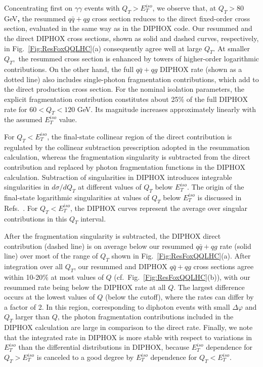 \documentclass[12pt,english,aps,preprint,prd,letterpaper,fleqn,nofootinbib,showpacs,showkeys,tightenlines,floatfix]{revtex4}
\begin{document}
{Concentrating first on $\gamma\gamma$ events with $Q_{T}>E_{T}^{iso}$,
we observe that, at $Q_{T}>80$ GeV\textbf{,} the resummed $q\bar{q}+qg$
cross section reduces to the direct fixed-order cross section, evaluated
in the same way as in the DIPHOX code. Our resummed and the direct
DIPHOX cross sections, shown as solid and dashed curves, respectively,
in Fig.~\ref{Fig:ResFoxQQLHC}(a) consequently agree well at large
$Q_{T}$. At smaller $Q_{T},$ the resummed cross section is enhanced
by towers of higher-order logarithmic contributions. On the other
hand, the full $q\bar{q}+qg$ DIPHOX rate (shown as a dotted line) also
includes single-photon fragmentation contributions, which add to
the direct production cross section.  For the nominal isolation parameters,
the explicit fragmentation contribution constitutes about 25\% of
the full DIPHOX rate for $60<Q_{T}<120$ GeV. Its magnitude increases
approximately linearly with the assumed $E_{T}^{iso}$ value.

For $Q_{T}<E_{T}^{iso}$, the final-state collinear region of the
direct contribution is regulated by the collinear subtraction prescription
adopted in the resummation calculation, whereas the fragmentation
singularity is subtracted from the direct contribution and replaced
by photon fragmentation functions in the DIPHOX calculation. Subtraction
of singularities in DIPHOX introduces integrable singularities in
$d\sigma/dQ_{T}$ at different values of $Q_{T}$ below $E_{T}^{iso}$.
The origin of the final-state logarithmic singularities at values
of $Q_{T}$ below $E_{T}^{iso}$ is discussed in Refs.~\cite{Berger:1996vy,Catani:1998yh,Catani:2002ny}.
For $Q_{T}<E_{T}^{iso}$, the DIPHOX curves represent the average
over singular contributions in this $Q_{T}$ interval.

After the fragmentation singularity is subtracted, the DIPHOX direct
contribution (dashed line) is on average below our resummed $q\bar{q}+qg$
rate (solid line) over most of the range of $Q_{T}$ shown 
in Fig.~\ref{Fig:ResFoxQQLHC}(a).  After integration over all
$Q_{T}$, our resummed and DIPHOX $q\bar{q}+qg$ cross sections agree
within 10-20\% at most values of $Q$ (cf.~Fig.~\ref{Fig:ResFoxQQLHC}(b)),
with our resummed rate being below the DIPHOX rate at all $Q$. The
largest difference occurs at the lowest values of $Q$ (below the
cutoff), where the rates can differ by a factor of 2. In this region,
corresponding to diphoton events with small $\Delta\varphi$ and $Q_{T}$
larger than $Q$, the photon fragmentation contributions included
in the DIPHOX calculation are large in comparison to the direct rate.
Finally, we note that the integrated rate in DIPHOX is more stable
with respect to variations in $E_{T}^{iso}$ than the differential
distributions in DIPHOX, because $E_{T}^{iso}$ dependence for $Q_{T}>E_{T}^{iso}$
is canceled to a good degree by $E_{T}^{iso}$ dependence for $Q_{T}<E_{T}^{iso}.$

}
\end{document}
